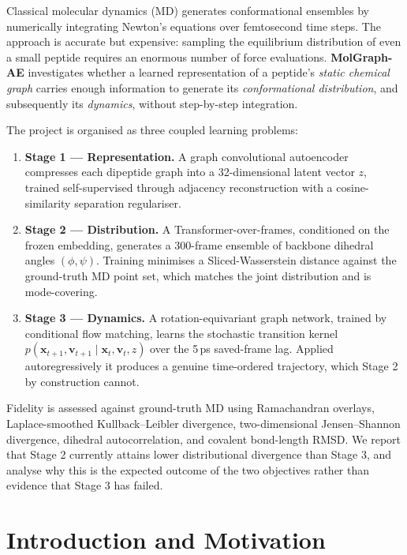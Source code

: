 \documentclass[11pt,a4paper]{article}
\newcommand{\phipsi}{$(\phi,\psi)$}
\begin{document}
Classical molecular dynamics (MD) generates conformational ensembles by
numerically integrating Newton's equations over femtosecond time steps. The
approach is accurate but expensive: sampling the equilibrium distribution of
even a small peptide requires an enormous number of force evaluations.
\textbf{MolGraph-AE} investigates whether a learned representation of a
peptide's \emph{static chemical graph} carries enough information to generate
its \emph{conformational distribution}, and subsequently its \emph{dynamics},
without step-by-step integration.

The project is organised as three coupled learning problems:

\begin{enumerate}
\item \textbf{Stage 1 — Representation.} A graph convolutional autoencoder
compresses each dipeptide graph into a 32-dimensional latent vector $z$,
trained self-supervised through adjacency reconstruction with a
cosine-similarity separation regulariser.

\item \textbf{Stage 2 — Distribution.} A Transformer-over-frames, conditioned
on the frozen embedding, generates a 300-frame ensemble of backbone dihedral
angles \phipsi{}. Training minimises a Sliced-Wasserstein distance against the
ground-truth MD point set, which matches the joint distribution and is
mode-covering.

\item \textbf{Stage 3 — Dynamics.} A rotation-equivariant graph network,
trained by conditional flow matching, learns the stochastic transition kernel
$p(\mathbf{x}_{t+1},\mathbf{v}_{t+1}\mid\mathbf{x}_t,\mathbf{v}_t,z)$ over the
5\,ps saved-frame lag. Applied autoregressively it produces a genuine
time-ordered trajectory, which Stage 2 by construction cannot.
\end{enumerate}

Fidelity is assessed against ground-truth MD using Ramachandran overlays,
Laplace-smoothed Kullback--Leibler divergence, two-dimensional
Jensen--Shannon divergence, dihedral autocorrelation, and covalent
bond-length RMSD. We report that Stage 2 currently attains lower distributional
divergence than Stage 3, and analyse why this is the expected outcome of the
two objectives rather than evidence that Stage 3 has failed.

\section{Introduction and Motivation}
\end{document}
